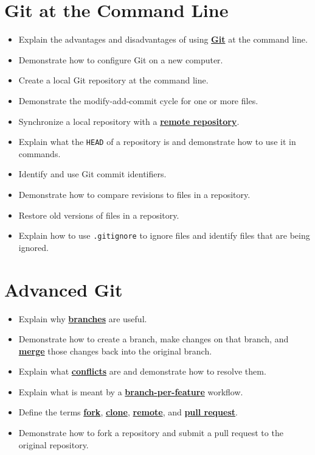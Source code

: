 \documentclass[
]{krantz}
\providecommand{\tightlist}{%
  \setlength{\itemsep}{0pt}\setlength{\parskip}{0pt}}
\newcommand{\gref}[2]{\hyperlink{#2}{\textbf{#1}}}
\begin{document}
\hypertarget{git-at-the-command-line}{%
\section{Git at the Command Line}\label{git-at-the-command-line}}

\begin{itemize}
\tightlist
\item
  Explain the advantages and disadvantages of using \gref{Git}{git} at the command line.
\item
  Demonstrate how to configure Git on a new computer.
\item
  Create a local Git repository at the command line.
\item
  Demonstrate the modify-add-commit cycle for one or more files.
\item
  Synchronize a local repository with a \gref{remote repository}{remote\_repository}.
\item
  Explain what the \texttt{HEAD} of a repository is and demonstrate how to use it in commands.
\item
  Identify and use Git commit identifiers.
\item
  Demonstrate how to compare revisions to files in a repository.
\item
  Restore old versions of files in a repository.
\item
  Explain how to use \texttt{.gitignore} to ignore files and identify files that are being ignored.
\end{itemize}

\hypertarget{advanced-git}{%
\section{Advanced Git}\label{advanced-git}}

\begin{itemize}
\tightlist
\item
  Explain why \gref{branches}{git\_branch} are useful.
\item
  Demonstrate how to create a branch, make changes on that branch, and \gref{merge}{git\_merge} those changes back into the original branch.
\item
  Explain what \gref{conflicts}{git\_conflict} are and demonstrate how to resolve them.
\item
  Explain what is meant by a \gref{branch-per-feature}{branch\_per\_feature} workflow.
\item
  Define the terms \gref{fork}{git\_fork}, \gref{clone}{git\_clone}, \gref{remote}{remote\_repository}, and \gref{pull request}{pull\_request}.
\item
  Demonstrate how to fork a repository and submit a pull request to the original repository.
\end{itemize}
\end{document}
